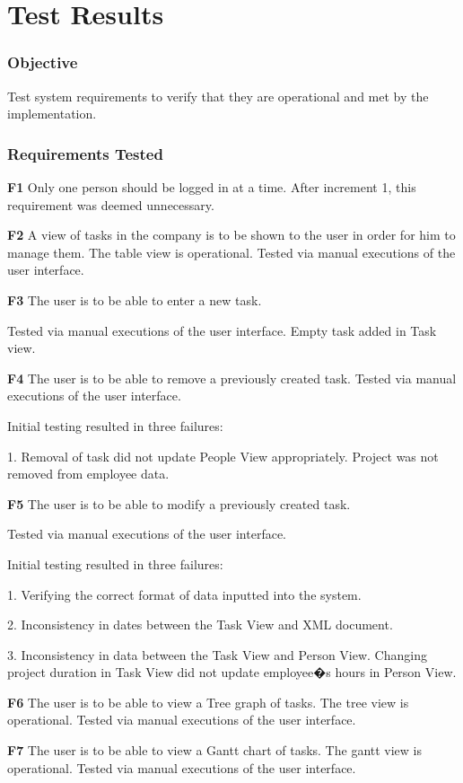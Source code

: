 \documentclass[12pt]{article}
\begin{document}
\section{Test Results}
\subsubsection{Objective} 
{
Test system requirements to verify that they are operational and met by the implementation.
}
\subsubsection{Requirements Tested} 
{
  {\bf F1} Only one person should be logged in at a time.
    After increment 1, this requirement was deemed unnecessary.

  {\bf F2} A view of tasks in the company is to be shown to the user in order for him to manage
them.
    The table view is operational. Tested via manual executions of the user interface.  

  {\bf F3} The user is to be able to enter a new task.

Tested via manual executions of the user interface. Empty task added in Task view.

  {\bf F4} The user is to be able to remove a previously created task.
    Tested via manual executions of the user interface.

Initial testing resulted in three failures:

1. Removal of task did not update People View appropriately. Project was not removed from employee data.

  {\bf F5} The user is to be able to modify a previously created task.

Tested via manual executions of the user interface.

Initial testing resulted in three failures:

1. Verifying the correct format of data inputted into the system.

2. Inconsistency in dates between the Task View and XML document.

3. Inconsistency in data between the Task View and Person View. Changing project duration in Task View did not update employee�s hours in Person View.

   {\bf F6} The user is to be able to view a Tree graph of tasks.
    The tree view is operational. Tested via manual executions of the user interface.  

   {\bf F7} The user is to be able to view a Gantt chart of tasks.
    The gantt view is operational. Tested via manual executions of the user interface.  

}
\end{document}
